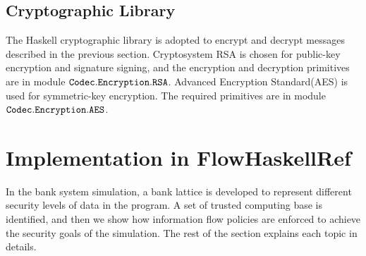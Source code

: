 \documentclass{report}
\newcommand{\co}[1]{$\cod{#1}$}
\begin{document}
\subsection{Cryptographic Library} 
The Haskell cryptographic library is adopted to encrypt and decrypt messages described in the previous section.
Cryptosystem RSA is chosen for public-key encryption and signature signing, and the encryption and 
decryption primitives are in module \co{Codec.Encryption.RSA}.
Advanced Encryption Standard(AES) is used for symmetric-key encryption. The required primitives are in module
\co{Codec.Encryption.AES}.


\section{Implementation in FlowHaskellRef}
In the bank system simulation, a bank lattice is developed to represent different security levels of data in the program. 
A set of trusted computing base is identified, and then we show how information flow policies are enforced to
achieve the security goals of the simulation. The rest of the section explains each topic in details.
\end{document}
